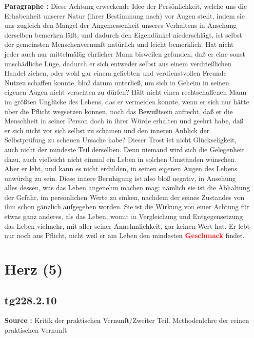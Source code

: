 \documentclass[a4paper,12pt,twoside]{book}
\newcommand{\match}[1]{\textcolor{red}{\textbf{#1}}}
\newcommand{\unnumberedsection}[1]{
	\section*{#1}
	\addcontentsline{toc}{section}{#1}
	\markright{#1}
}
\begin{document}
	\noindent\textbf{Paragraphe : }
	Diese Achtung erweckende Idee der Persönlichkeit, welche uns die Erhabenheit unserer Natur (ihrer Bestimmung nach) vor Augen stellt, indem sie uns zugleich den Mangel der Angemessenheit unseres Verhaltens in Ansehung derselben bemerken läßt, und dadurch den Eigendünkel niederschlägt, ist selbst der gemeinsten Menschenvernunft natürlich und leicht bemerklich. Hat nicht jeder auch nur mittelmäßig ehrlicher Mann bisweilen gefunden, daß er eine sonst unschädliche Lüge, dadurch er sich entweder selbst aus einem verdrießlichen Handel ziehen, oder wohl gar einem geliebten und verdienstvollen Freunde Nutzen schaffen konnte, bloß darum unterließ, um sich in Geheim in seinen eigenen Augen nicht verachten zu dürfen? Hält nicht einen rechtschaffenen Mann im größten Unglücke des Lebens, das er vermeiden konnte, wenn er sich nur hätte über die Pflicht wegsetzen können, noch das Bewußtsein aufrecht, daß er die Menschheit in seiner Person doch in ihrer Würde erhalten und geehrt habe, daß er sich nicht vor sich selbst zu schämen und den inneren Anblick der Selbstprüfung zu scheuen Ursache habe? Dieser Trost ist nicht Glückseligkeit, auch nicht der mindeste Teil derselben. Denn niemand wird sich die Gelegenheit dazu, auch vielleicht nicht einmal ein Leben in solchen Umständen wünschen. Aber er lebt, und kann es nicht erdulden, in seinen eigenen Augen des Lebens unwürdig zu sein. Diese innere Beruhigung ist also bloß negativ, in Ansehung alles dessen, was das Leben angenehm machen mag; nämlich sie ist die Abhaltung der Gefahr, im persönlichen Werte zu sinken, nachdem der seines Zustandes von ihm schon gänzlich aufgegeben worden. Sie ist die Wirkung von einer Achtung für etwas ganz anderes, als das Leben, womit in Vergleichung und Entgegensetzung das Leben vielmehr, mit aller seiner Annehmlichkeit, gar keinen Wert hat. Er lebt nur noch aus Pflicht, nicht weil er am Leben den mindesten \match{Geschmack} findet. 
	
	\unnumberedsection{Herz (5)} 
	\subsection*{tg228.2.10} 
	\textbf{Source : }Kritik der praktischen Vernunft/Zweiter Teil. Methodenlehre der reinen praktischen Vernunft\\  
	
\end{document}

